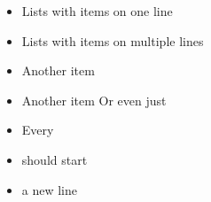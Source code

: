 \documentclass{article}
\begin{document}
\begin{itemize}

\item Lists with items on one line

\item Lists with items
on multiple lines

\item Another item

\item Another item
Or even just %

\item Every \item should start \item a new line

\end{itemize}
\end{document}

